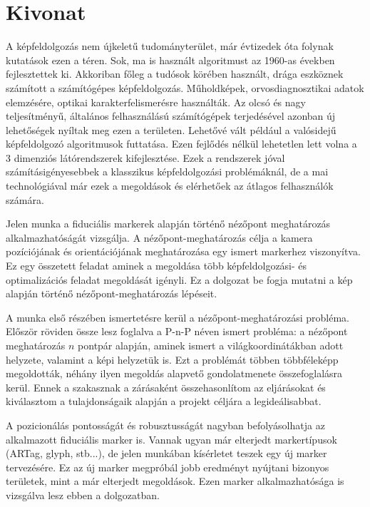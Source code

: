 \chapter*{Kivonat}
A képfeldolgozás nem újkeletű tudományterület, már évtizedek óta folynak kutatások ezen a téren.
Sok, ma is használt algoritmust az 1960-as években fejlesztettek ki.
Akkoriban főleg a tudósok körében használt, drága eszköznek számított a számítógépes képfeldolgozás.
Műholdképek, orvosdiagnosztikai adatok elemzésére, optikai karakterfelismerésre használták.
Az olcsó és nagy teljesítményű, általános felhasználású számítógépek terjedésével azonban új lehetőségek nyíltak meg ezen a területen.
Lehetővé vált például a valósidejű képfeldolgozó algoritmusok futtatása.
Ezen fejlődés nélkül lehetetlen lett volna a 3 dimenziós látórendszerek kifejlesztése.
Ezek a rendszerek jóval számításigényesebbek a klasszikus képfeldolgozási problémáknál, de a mai technológiával már ezek a megoldások és elérhetőek az átlagos felhasználók számára.

Jelen munka a fiduciális markerek alapján történő nézőpont meghatározás alkalmazhatóságát vizsgálja.
A nézőpont-meghatározás célja a kamera pozíciójának és orientációjának meghatározása egy ismert markerhez viszonyítva.
Ez egy összetett feladat aminek a megoldása több képfeldolgozási- és optimalizációs feladat megoldását igényli.
Ez a dolgozat be fogja mutatni a kép alapján történő nézőpont-meghatározás lépéseit.

A munka első részében ismertetésre kerül a nézőpont-meghatározási probléma.
Először röviden össze lesz foglalva a P-n-P néven ismert probléma: a nézőpont meghatározás $n$ pontpár alapján, aminek ismert a világkoordinátákban adott helyzete, valamint a képi helyzetük is.
Ezt a problémát többen többféleképp megoldották, néhány ilyen megoldás alapvető gondolatmenete összefoglalásra kerül.
Ennek a szakasznak a zárásaként összehasonlítom az eljárásokat és kiválasztom a tulajdonságaik alapján a projekt céljára a legideálisabbat.

A pozicionálás pontosságát és robusztusságát nagyban befolyásolhatja az alkalmazott fiduciális marker is.
Vannak ugyan már elterjedt markertípusok (ARTag, glyph, stb...), de jelen munkában kísérletet teszek egy új marker tervezésére.
Ez az új marker megpróbál jobb eredményt nyújtani bizonyos területek, mint a már elterjedt megoldások.
Ezen marker alkalmazhatósága is vizsgálva lesz ebben a dolgozatban.

